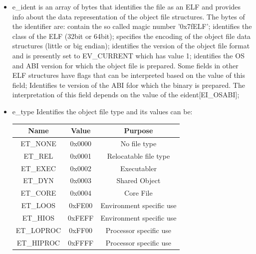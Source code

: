 \begin{itemize} 
    \item {\ttfamily e\_ident} is an array of bytes that identifies the file as an ELF and provides info about the data representation of the object file structures. The bytes of the identifier are:
     contain the so called magic number '0x7fELF';
     identifies the class of the ELF (32bit or 64bit);
     specifies the encoding of the object file data structures (little or big endian);
     identifies the version of the object file format and is     presently set to EV\_CURRENT which has value 1;
     identifies the OS and ABI version for which the object file is prepared. Some fields in other ELF structures have flags that can be interpreted based on the value of this field;
     Identifies te version of the ABI fdor which the binary is prepared. The interpretation of this field depends on the value of the {\ttfamily e\-ident[EI\_OSABI]};
    \item {\ttfamily e\_type} Identifies the object file type and its values can be:\newline
    \begin{center}
        \begin{tabular}{|c|c|c|} \hline \textbf{Name} & \textbf{Value} & \textbf{Purpose} \\ 
            \hline {\ttfamily ET\_NONE} & 0x0000 & No file type \\
            \hline {\ttfamily ET\_REL} & 0x0001 & Relocatable file type \\
            \hline {\ttfamily ET\_EXEC} & 0x0002 & Executabler \\
            \hline {\ttfamily ET\_DYN} & 0x0003 & Shared Object \\
            \hline {\ttfamily ET\_CORE} & 0x0004 & Core File \\
            \hline {\ttfamily ET\_LOOS} & 0xFE00 & Environment specific use \\
            \hline {\ttfamily ET\_HIOS} & 0xFEFF & Environment specific use\\
            \hline {\ttfamily ET\_LOPROC} & 0xFF00 & Processor specific use\\
            \hline {\ttfamily ET\_HIPROC} & 0xFFFF & Processor specific use\\

\end{tabular}
\end{center}
\end{itemize}
